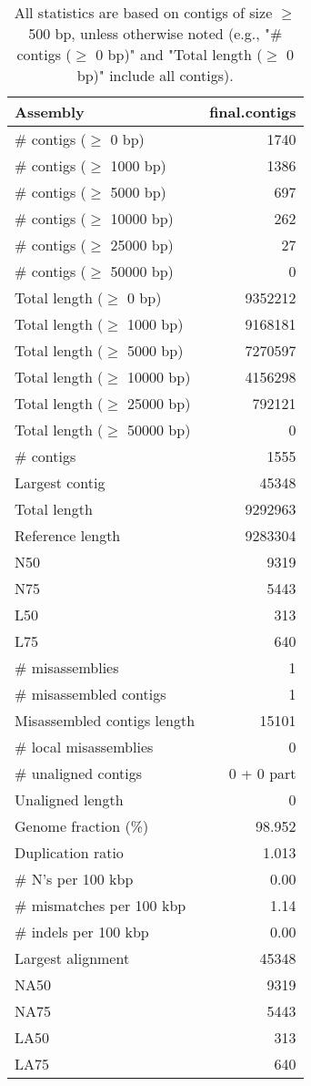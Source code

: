 \documentclass[12pt,a4paper]{article}
\begin{document}
\begin{table}[ht]
\begin{center}
\caption{All statistics are based on contigs of size $\geq$ 500 bp, unless otherwise noted (e.g., "\# contigs ($\geq$ 0 bp)" and "Total length ($\geq$ 0 bp)" include all contigs).}
\begin{tabular}{|l*{1}{|r}|}
\hline
Assembly & final.contigs \\ \hline
\# contigs ($\geq$ 0 bp) & 1740 \\ \hline
\# contigs ($\geq$ 1000 bp) & 1386 \\ \hline
\# contigs ($\geq$ 5000 bp) & 697 \\ \hline
\# contigs ($\geq$ 10000 bp) & 262 \\ \hline
\# contigs ($\geq$ 25000 bp) & 27 \\ \hline
\# contigs ($\geq$ 50000 bp) & 0 \\ \hline
Total length ($\geq$ 0 bp) & 9352212 \\ \hline
Total length ($\geq$ 1000 bp) & 9168181 \\ \hline
Total length ($\geq$ 5000 bp) & 7270597 \\ \hline
Total length ($\geq$ 10000 bp) & 4156298 \\ \hline
Total length ($\geq$ 25000 bp) & 792121 \\ \hline
Total length ($\geq$ 50000 bp) & 0 \\ \hline
\# contigs & 1555 \\ \hline
Largest contig & 45348 \\ \hline
Total length & 9292963 \\ \hline
Reference length & 9283304 \\ \hline
N50 & 9319 \\ \hline
N75 & 5443 \\ \hline
L50 & 313 \\ \hline
L75 & 640 \\ \hline
\# misassemblies & 1 \\ \hline
\# misassembled contigs & 1 \\ \hline
Misassembled contigs length & 15101 \\ \hline
\# local misassemblies & 0 \\ \hline
\# unaligned contigs & 0 + 0 part \\ \hline
Unaligned length & 0 \\ \hline
Genome fraction (\%) & 98.952 \\ \hline
Duplication ratio & 1.013 \\ \hline
\# N's per 100 kbp & 0.00 \\ \hline
\# mismatches per 100 kbp & 1.14 \\ \hline
\# indels per 100 kbp & 0.00 \\ \hline
Largest alignment & 45348 \\ \hline
NA50 & 9319 \\ \hline
NA75 & 5443 \\ \hline
LA50 & 313 \\ \hline
LA75 & 640 \\ \hline
\end{tabular}
\end{center}
\end{table}
\end{document}
